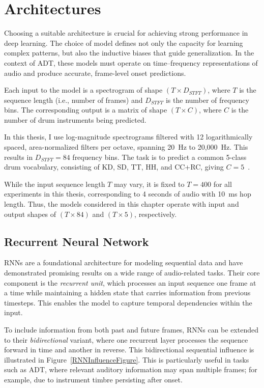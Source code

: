 \chapter{Architectures}\label{Architectures}

Choosing a suitable architecture is crucial for achieving strong performance in deep learning. The choice of model defines not only the capacity for learning complex patterns, but also the inductive biases that guide generalization. In the context of \gls{ADT}, these models must operate on time–frequency representations of audio and produce accurate, frame-level onset predictions.

Each input to the model is a spectrogram of shape $(T \times D_{STFT})$, where $T$ is the sequence length (i.e., number of frames) and $D_{STFT}$ is the number of frequency bins. The corresponding output is a matrix of shape $(T \times C)$, where $C$ is the number of drum instruments being predicted.

In this thesis, I use log-magnitude spectrograms filtered with 12 logarithmically spaced, area-normalized filters per octave, spanning 20~Hz to 20,000~Hz. This results in $D_{STFT} = 84$ frequency bins. The task is to predict a common 5-class drum vocabulary, consisting of \acrfull{KD}, \acrfull{SD}, \acrfull{TT}, \acrfull{HH}, and \acrfull{CC+RC}, giving $C = 5$~\cite{zehren2024analyzingreducingsynthetictorealtransfer}.

While the input sequence length $T$ may vary, it is fixed to $T = 400$ for all experiments in this thesis, corresponding to 4 seconds of audio with 10~ms hop length. Thus, the models considered in this chapter operate with input and output shapes of $(T \times 84)$ and $(T \times 5)$, respectively.

\section{Recurrent Neural Network}

\glspl{RNN} are a foundational architecture for modeling sequential data and have demonstrated promising results on a wide range of audio-related tasks. Their core component is the \textit{recurrent unit}, which processes an input sequence one frame at a time while maintaining a hidden state that carries information from previous timesteps. This enables the model to capture temporal dependencies within the input.

To include information from both past and future frames, \glspl{RNN} can be extended to their \textit{bidirectional} variant, where one recurrent layer processes the sequence forward in time and another in reverse. This bidirectional sequential influence is illustrated in Figure~\ref{RNNInfluenceFigure}. This is particularly useful in tasks such as \gls{ADT}, where relevant auditory information may span multiple frames; for example, due to instrument timbre persisting after onset.

